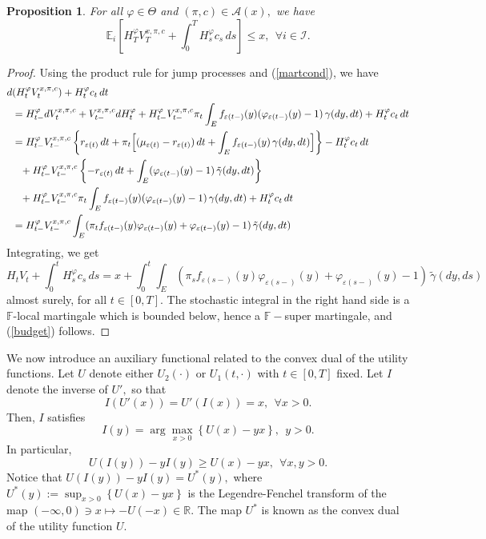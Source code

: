 \documentclass[11pt]{article}
\theoremstyle{plain}
\newtheorem{proposition}[theorem]{Proposition}
\theoremstyle{definition}
\numberwithin{equation}{section}
\newcommand{\set}[1]{\left\{#1\right\}}
\newcommand{\calI}{\mathcal{I}}
\newcommand{\eps}{\varepsilon}
\newcommand{\R}{\mathds{R}}
\newcommand{\Exp}{\mathds{E}}
\newcommand{\A}{\mathcal{A}}
\newcommand{\Fil}{\mathds{F}}
\begin{document}
\begin{proposition}
For all $\varphi\in\Theta$ and $(\pi,c)\in\A(x),$ we have
\begin{equation}\label{budget}
\Exp_i\left[H_T^\varphi V_T^{x,\pi,c}+\int_0^TH_s^\varphi c_s\,ds\right]\le x, \ \ \forall i\in\calI.
\end{equation}
\end{proposition}
\begin{proof}
Using the product rule for jump processes     and (\ref{martcond}), we have
\begin{align*}
  d&(H^\varphi_t V^{x,\pi,c}_t)+H^\varphi_tc_t\,dt\\
  &=H^\varphi_{t-}dV^{x,\pi,c}_t+V^{x,\pi,c}_{t-}dH^\varphi_{t}+H^\varphi_{t-}V^{x,\pi,c}_{t-}\pi_t\int_Ef_{\eps(t-)}(y)(\varphi_{\eps(t-)}(y)-1)\,\gamma(dy,dt)+H^\varphi_tc_t\,dt\\
  &=H^\varphi_{t-}V^{x,\pi,c}_{t-}\left\{r_{\eps(t)}\,dt+\pi_t\Bigl[(\mu_{\eps(t)}-r_{\eps(t)})\,dt+\int_E f_{\eps(t-)}(y)\,\gamma(dy,dt)\Bigr]\right\}-H^\varphi_tc_t\,dt\\
  &\phantom{=}+H^\varphi_{t-}V^{x,\pi,c}_{t-}\left\{-r_{\eps(t)}\,dt+\int_E(\varphi_{\eps(t-)}(y)-1)\,\tilde{\gamma}(dy,dt)\right\}\\
  &\phantom{=}+H^\varphi_{t-}V^{x,\pi,c}_{t-}\pi_t\int_Ef_{\eps(t-)}(y)(\varphi_{\eps(t-)}(y)-1)\,\gamma(dy,dt)+H^\varphi_tc_t\,dt\\
  &=H^\varphi_{t-}V^{x,\pi,c}_{t-}\int_E(\pi_tf_{\eps(t-)}(y)\varphi_{\eps(t-)}(y)+\varphi_{\eps(t-)}(y)-1)\,\tilde{\gamma}(dy,dt)
\end{align*}
Integrating, we get
\begin{equation*}
  H_tV_t+\int_0^t H_s^\varphi c_s\,ds
  = x+ \int_0^t\int_E(\pi_sf_{\eps(s-)}(y)\varphi_{\eps(s-)}(y)+\varphi_{\eps(s-)}(y)-1)\,\tilde{\gamma}(dy,ds)
\end{equation*}
almost surely, for all $t\in [0,T].$ The stochastic integral in the right hand side is a $\Fil$-local martingale which is bounded below, hence a $\Fil-$super martingale, and (\ref{budget}) follows.
\end{proof}
We now introduce an auxiliary functional related to the convex dual of the utility functions. Let $U$ denote either $U_2(\cdot)$ or $U_1(t,\cdot)$ with $t\in[0,T]$ fixed. Let $I$  denote the inverse of $U',$  so that
\[
I(U'(x))=U'(I(x))=x, \ \ \forall x>0.
\]
Then, $I$ satisfies
\[
I(y)=\arg\max_{x>0}\set{U(x)-yx}, \ \ y>0.
\]
In particular,
\begin{equation}\label{ineqUI}
U(I(y))-yI(y)\geq U(x)-yx, \ \ \forall x,y>0.
\end{equation}
Notice that $U(I(y))-yI(y)=U^*(y),$ where $U^*(y):=\sup_{x>0}\set{U(x)-yx}$ is the Legendre-Fenchel transform of the map $(-\infty,0)\ni x\mapsto -U(-x)\in\R.$ The map $U^*$ is known as the convex dual of the utility function $U.$
\end{document}
